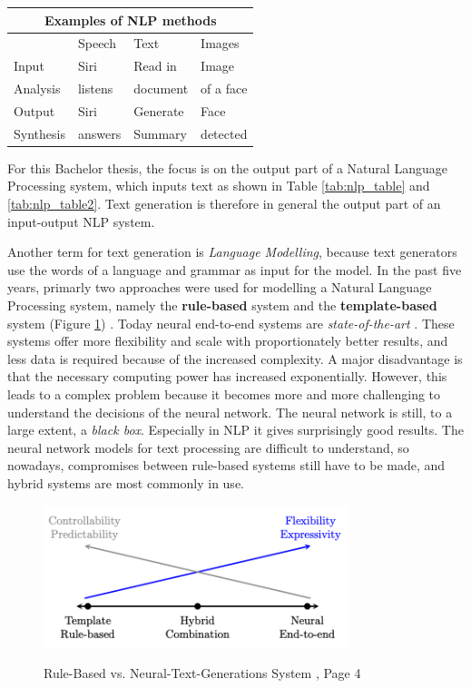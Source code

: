 \begin{center} 
	\begin{tabular}{ |p{3cm}||p{3cm}|p{3cm}|p{3cm}|}
		\hline
		\multicolumn{4}{|c|}{\textbf{Examples of NLP methods}}\\ \hline\hline
		&Speech &Text &Images \\ \hline
		Input &Siri &Read in &Image \\
		Analysis &listens  &document     &of a face \\ \hline \hline
		Output &Siri &\cellcolor[HTML]{F3E687}Generate &Face \\
		Synthesis &answers & \cellcolor[HTML]{F3E687}Summary &detected \\ \hline
	\end{tabular}
	\label{tab:nlp_table2}
\end{center}

For this Bachelor thesis, the focus is on the output part of a Natural Language Processing system, which inputs text as shown in Table \ref{tab:nlp_table} and \ref{tab:nlp_table2}. Text generation is therefore in general the output part of an input-output NLP system.

Another term for text generation is  \textit{Language Modelling}, because text generators use the words of a language and grammar as input for the model. In the past five years, primarly two approaches were used for modelling a Natural Language Processing system, namely the \textbf{rule-based} system and the \textbf{template-based} system (Figure \ref{rules_based}) \cite{NTG2}. Today neural end-to-end systems are \textit{state-of-the-art} \cite{End_to_End}. These systems offer more flexibility and scale with proportionately better results, and less data is required because of the increased complexity. A major disadvantage is that the necessary computing power has increased exponentially. However, this leads to a complex problem because it becomes more and more challenging to understand the decisions of the neural network. The neural network is still, to a large extent, a \textit{black box}. Especially in NLP it gives surprisingly good results. The neural network models for text processing are difficult to understand, so nowadays, compromises between rule-based systems still have to be made, and hybrid systems are most commonly in use. 


\begin{figure}
  \begin{center}
  \includegraphics[width=3.5in]{photos/rule_based}\\
  \caption{Rule-Based vs. Neural-Text-Generations System \cite{NTG2}, Page 4}\label{rules_based}
  \end{center}
\end{figure}

